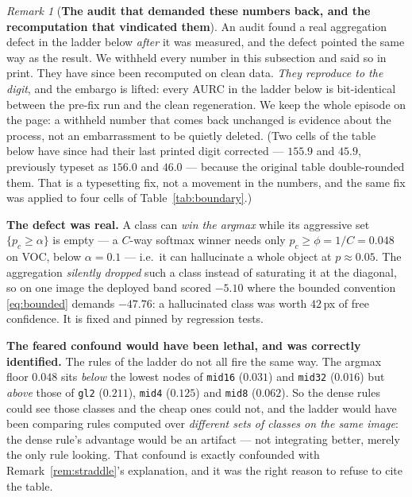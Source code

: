 \documentclass[11pt]{article}
\theoremstyle{remark}
\newtheorem{remark}{Remark}
\begin{document}
\begin{remark}[\textbf{The audit that demanded these numbers back, and the recomputation
that vindicated them}]\label{rem:mladdercontam}
An audit found a real aggregation defect in the ladder below \emph{after} it was
measured, and the defect pointed the same way as the result. We withheld every number in
this subsection and said so in print. They have since been recomputed on clean data.
\emph{They reproduce to the digit}, and the embargo is lifted: every AURC in the ladder
below is bit-identical between the pre-fix run and the clean regeneration. We keep the
whole episode on the page: a withheld number that comes back unchanged is evidence about
the process, not an embarrassment to be quietly deleted. (Two cells of the table below
have since had their last printed digit corrected --- $155.9$ and $45.9$, previously
typeset as $156.0$ and $46.0$ --- because the original table double-rounded them. That
is a typesetting fix, not a movement in the numbers, and the same fix was applied to
four cells of Table~\ref{tab:boundary}.)

\textbf{The defect was real.} A class can \emph{win the argmax} while its aggressive set
$\{p_c \ge \alpha\}$ is empty --- a $C$-way softmax winner needs only
$p_c \ge \phi = 1/C = 0.048$ on VOC, below $\alpha = 0.1$ --- i.e.\ it can hallucinate a
whole object at $p \approx 0.05$. The aggregation \emph{silently dropped} such a class
instead of saturating it at the diagonal, so on one image the deployed band scored
$-5.10$ where the bounded convention \eqref{eq:bounded} demands $-47.76$: a hallucinated
class was worth $42$\,px of free confidence. It is fixed and pinned by regression tests.

\textbf{The feared confound would have been lethal, and was correctly identified.} The
rules of the ladder do not all fire the same way. The argmax floor $0.048$ sits \emph{below} the
lowest nodes of \texttt{mid16} ($0.031$) and \texttt{mid32} ($0.016$) but \emph{above}
those of \texttt{gl2} ($0.211$), \texttt{mid4} ($0.125$) and \texttt{mid8} ($0.062$). So
the dense rules could see those classes and the cheap ones could not, and the ladder
would have been comparing rules computed over \emph{different sets of classes on the same
image}: the dense rule's advantage would be an artifact --- not integrating better,
merely the only rule looking. That confound is exactly confounded with
Remark~\ref{rem:straddle}'s explanation, and it was the right reason to refuse to cite
the table.


\end{remark}
\end{document}
